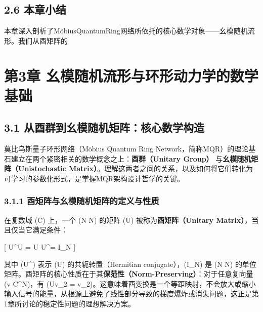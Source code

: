 \documentclass[
  12pt,
]{article}
\begin{document}
\hypertarget{ux672cux7ae0ux5c0fux7ed3}{%
\subsection{2.6 本章小结}\label{ux672cux7ae0ux5c0fux7ed3}}

本章深入剖析了MöbiusQuantumRing网络所依托的核心数学对象------幺模随机流形。我们从酉矩阵的

\hypertarget{ux7b2c3ux7ae0-ux5e7aux6a21ux968fux673aux6d41ux5f62ux4e0eux73afux5f62ux52a8ux529bux5b66ux7684ux6570ux5b66ux57faux7840}{%
\section{第3章
幺模随机流形与环形动力学的数学基础}\label{ux7b2c3ux7ae0-ux5e7aux6a21ux968fux673aux6d41ux5f62ux4e0eux73afux5f62ux52a8ux529bux5b66ux7684ux6570ux5b66ux57faux7840}}

\hypertarget{ux4eceux9149ux7fa4ux5230ux5e7aux6a21ux968fux673aux77e9ux9635ux6838ux5fc3ux6570ux5b66ux6784ux9020}{%
\subsection{3.1
从酉群到幺模随机矩阵：核心数学构造}\label{ux4eceux9149ux7fa4ux5230ux5e7aux6a21ux968fux673aux77e9ux9635ux6838ux5fc3ux6570ux5b66ux6784ux9020}}

莫比乌斯量子环形网络（Möbius Quantum Ring
Network，简称MQR）的理论基石建立在两个紧密相关的数学概念之上：\textbf{酉群（Unitary
Group）} 与\textbf{幺模随机矩阵（Unistochastic
Matrix）}。理解这两者之间的关系，以及如何将它们转化为可学习的参数化形式，是掌握MQR架构设计哲学的关键。

\hypertarget{ux9149ux77e9ux9635ux4e0eux5e7aux6a21ux968fux673aux77e9ux9635ux7684ux5b9aux4e49ux4e0eux6027ux8d28}{%
\subsubsection{3.1.1
酉矩阵与幺模随机矩阵的定义与性质}\label{ux9149ux77e9ux9635ux4e0eux5e7aux6a21ux968fux673aux77e9ux9635ux7684ux5b9aux4e49ux4e0eux6027ux8d28}}

在复数域 (C) 上，一个 (N \times N) 的矩阵 (U)
被称为\textbf{酉矩阵（Unitary Matrix）}，当且仅当它满足条件：

{[} U\^{}\dagger U = U U\^{}\dagger = I\_N {]}

其中 (U\^{}\dagger) 表示 (U) 的共轭转置（Hermitian conjugate），(I\_N)
是 (N \times N)
的单位矩阵。酉矩阵的核心性质在于其\textbf{保范性（Norm-Preserving）}：对于任意复向量
(v \in C\^{}N)，有 (\textbar Uv\textbar\_2 =
\textbar v\textbar\_2)。这意味着酉变换是一个等距映射，不会放大或缩小输入信号的能量，从根源上避免了线性部分导致的梯度爆炸或消失问题，这正是第1章所讨论的稳定性问题的理想解决方案。
\end{document}
